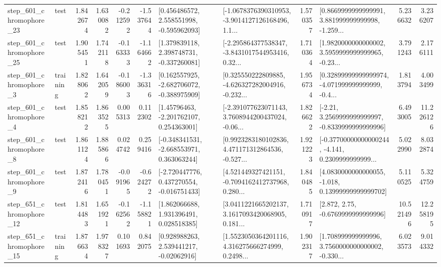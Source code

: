 \begin{tabular}{llrrrrllrlrr}
  step\_601\_chromophore\_23 &      test &      1.842674 &    1.630082 &     -0.212592 & -1.537644 &    [0.456486572, 2.558551998, -0.595962093] &  [-1.0678376390310953, -3.9014127126168496, 1.1... &       1.570357 &  [0.8669999999999991, 3.881999999999998, -1.259... &            5.236632 &          3.236207 \\
  step\_601\_chromophore\_25 &      test &      1.905451 &    1.742118 &     -0.163333 & -1.164662 &    [1.379839118, 2.398748731, -0.337260081] &  [-2.295864377538347, -3.8431017544953416, 0.32... &       1.710364 &  [1.9820000000000002, 3.5959999999999965, -0.23... &            3.791243 &          2.176111 \\
   step\_601\_chromophore\_3 &  training &      1.828062 &    1.642059 &     -0.186003 & -1.336316 &   [0.162557925, -2.682706072, -0.388975909] &  [0.325550222809885, -4.626327282004916, -0.232... &       1.956734 &  [0.32899999999999974, -4.071999999999999, -0.4... &            1.813794 &          4.003499 \\
   step\_601\_chromophore\_4 &      test &      1.858212 &    1.863525 &      0.005313 &  0.112302 &     [1.45796463, -2.201762107, 0.254363001] &  [-2.391077623071143, 3.7608944200437024, -0.06... &       1.826622 &   [-2.21, 3.2569999999999997, -0.8339999999999996] &            6.493005 &         11.226126 \\
   step\_601\_chromophore\_8 &      test &      1.861124 &    1.885866 &      0.024742 &  0.259416 &   [-0.348341531, -2.668553971, 0.363063244] &  [0.9923283180102836, 4.471171312864536, -0.527... &       1.921223 &  [-0.37700000000000244, -4.141, 0.2309999999999... &            5.022990 &          8.032874 \\
   step\_601\_chromophore\_9 &      test &      1.872416 &    1.780451 &     -0.091965 & -0.624272 &   [-2.720447776, 0.437270554, -0.016751433] &  [4.521449327421151, -0.7094162412737968, 0.280... &       1.840485 &  [4.0830000000000055, -1.018, 0.13999999999999702] &            5.110525 &          5.324759 \\
  step\_651\_chromophore\_12 &      test &      1.814483 &    1.651921 &     -0.162562 & -1.158821 &     [1.862066688, 1.931396491, 0.028518385] &  [3.0411221665202137, 3.1617093420068905, 0.181... &       1.710917 &                 [2.872, 2.75, -0.6769999999999996] &           10.521496 &         12.258195 \\
  step\_651\_chromophore\_15 &  training &      1.876634 &    1.978327 &      0.101693 &  0.842075 &     [0.928988263, 2.539441217, -0.02062916] &  [1.5523050364201116, 4.316275666274999, 0.2498... &       1.902317 &  [1.708999999999996, 3.7560000000000002, -0.330... &            6.023573 &          9.014332 \\

\end{tabular}
